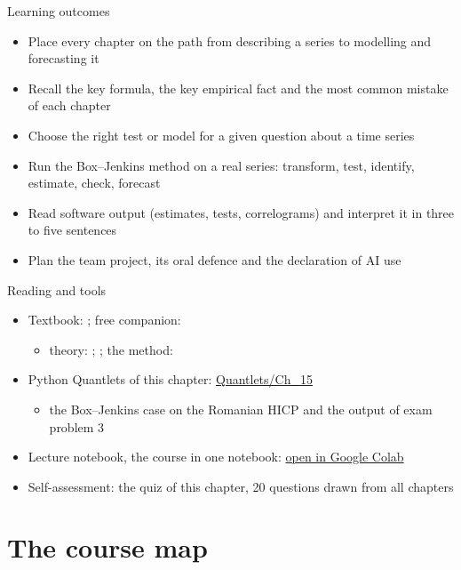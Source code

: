 \begin{frame}{Learning outcomes}
\itemsize{\small}
\begin{itemize}
    \item Place every chapter on the path from describing a series to modelling and forecasting it
    \item Recall the key formula, the key empirical fact and the most common mistake of each chapter
    \item Choose the right test or model for a given question about a time series
    \item Run the Box--Jenkins method on a real series: transform, test, identify, estimate, check, forecast
    \item Read software output (estimates, tests, correlograms) and interpret it in three to five sentences
    \item Plan the team project, its oral defence and the declaration of AI use
\end{itemize}
\end{frame}

\begin{frame}{Reading and tools}
\itemsize{\small}
\begin{itemize}
    \item Textbook: ; free companion: 
    \begin{itemize}
        \item theory: ; ; the method: 
    \end{itemize}
    \item Python Quantlets of this chapter: \href{https://github.com/danpele/Time-Series-Analysis/tree/main/Quantlets/Ch_15}{Quantlets/Ch\_15}
    \begin{itemize}
        \item the Box--Jenkins case on the Romanian HICP and the output of exam problem 3
    \end{itemize}
    \item Lecture notebook, the course in one notebook: \href{\colaburl{notebooks/EN/chapter15_lecture_notebook.ipynb}}{open in Google Colab}
    \item Self-assessment: the quiz of this chapter, 20 questions drawn from all chapters
\end{itemize}
\end{frame}


\section{The course map}

